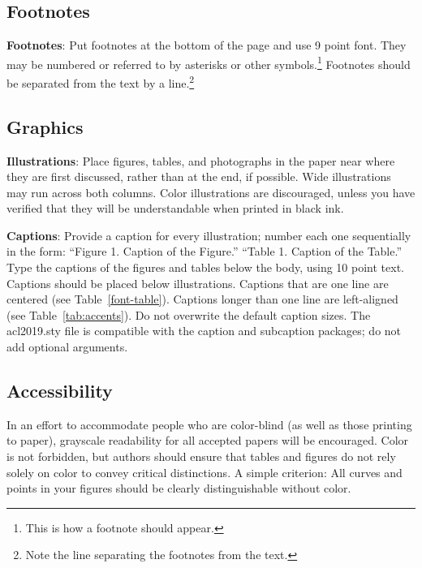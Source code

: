 \documentclass[11pt,a4paper]{article}
\begin{document}
\subsection{Footnotes}

{\bf Footnotes}: Put footnotes at the bottom of the page and use 9
point font. They may be numbered or referred to by asterisks or other
symbols.\footnote{This is how a footnote should appear.} Footnotes
should be separated from the text by a line.\footnote{Note the line
separating the footnotes from the text.}

\subsection{Graphics}

{\bf Illustrations}: Place figures, tables, and photographs in the
paper near where they are first discussed, rather than at the end, if
possible.  Wide illustrations may run across both columns.  Color
illustrations are discouraged, unless you have verified that  
they will be understandable when printed in black ink.

{\bf Captions}: Provide a caption for every illustration; number each one
sequentially in the form:  ``Figure 1. Caption of the Figure.'' ``Table 1.
Caption of the Table.''  Type the captions of the figures and 
tables below the body, using 10 point text. Captions should be placed below illustrations. Captions that are one line are centered (see Table~\ref{font-table}). Captions longer than one line are left-aligned (see Table~\ref{tab:accents}). Do not overwrite the default caption sizes. The acl2019.sty file is compatible with the caption and subcaption packages; do not add optional arguments.


\subsection{Accessibility}
\label{ssec:accessibility}

In an effort to accommodate people who are color-blind (as well as those printing
to paper), grayscale readability for all accepted papers will be
encouraged.  Color is not forbidden, but authors should ensure that
tables and figures do not rely solely on color to convey critical
distinctions. A simple criterion: All curves and points in your figures should be clearly distinguishable without color.

\end{document}
